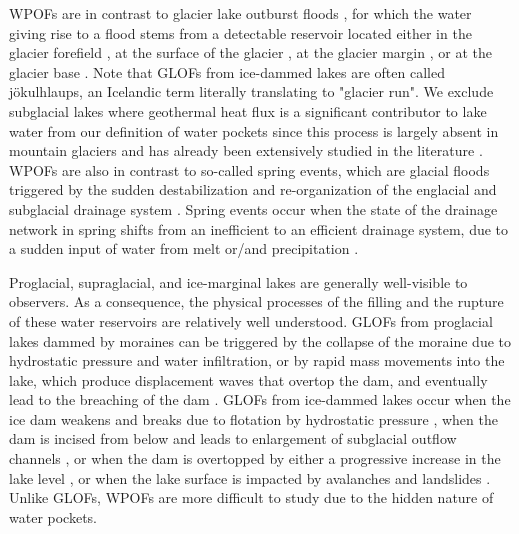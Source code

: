 WPOFs are in contrast to glacier lake outburst floods \citep[GLOFs,][]{Roberts2005, Bjornsson2010,Carrivick&Tweed2016,Emmer&al2022,Zhang&al2024}, for which the water giving rise to a flood stems from a detectable reservoir located either in the glacier forefield \citep[i.e.\ proglacial lake, see][for a review]{Neupane&al2019}, at the surface of the glacier \citep[i.e.\ supraglacial lake, e.g.][]{Walder&Costa1996,Raymond&al2003,Kingslake&al2015}, at the glacier margin \citep[i.e.\ ice-marginal lake, e.g.][]{Huss&al2007}, or at the glacier base \citep[i.e.\ subglacial lake, see][]{Bjornsson2010}. Note that GLOFs from ice-dammed lakes are often called jökulhlaups, an Icelandic term literally translating to "glacier run". We exclude subglacial lakes where geothermal heat flux is a significant contributor to lake water from our definition of water pockets since this process is largely absent in mountain glaciers and has already been extensively studied in the literature \citep[e.g.][]{Bjornsson2010,Livingstone&al2022}. WPOFs are also in contrast to so-called spring events, which are glacial floods triggered by the sudden destabilization and re-organization of the englacial and subglacial drainage system \citep[e.g.][]{Iken&Bindschadler1986, Kamb1987,Warburton&Fenn1994}. Spring events occur when the state of the drainage network in spring shifts from an inefficient to an efficient drainage system, due to a sudden input of water from melt or/and precipitation \citep[e.g.][]{Walder&Driedger1995}. 

Proglacial, supraglacial, and ice-marginal lakes are generally well-visible to observers. As a consequence, the physical processes of the filling and the rupture of these water reservoirs are relatively well understood. GLOFs from proglacial lakes dammed by moraines can be triggered by the collapse of the moraine due to hydrostatic pressure and water infiltration, or by rapid mass movements into the lake, which produce displacement waves that overtop the dam, and eventually lead to the breaching of the dam \citep{Neupane&al2019}. GLOFs from ice-dammed lakes occur when the ice dam weakens and breaks due to flotation by hydrostatic pressure \citep[e.g.][]{Bjornsson2010}, when the dam is incised from below and leads to enlargement of subglacial outflow channels \citep{Nye1976}, or when the dam is overtopped by either a progressive increase in the lake level \citep[e.g.][]{Raymond&Nolan2000, Ogier&al2021}, or when the lake surface is impacted by avalanches and landslides \citep[e.g.][]{Haeberli1983, Clague&Evans2000}. Unlike GLOFs, WPOFs are more difficult to study due to the hidden nature of water pockets.

